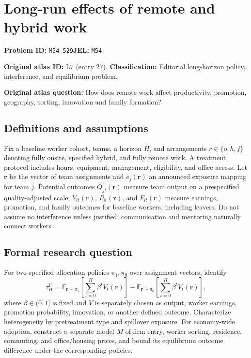 \documentclass[11pt,a4paper]{article}
\begin{document}
\section*{Long-run effects of remote and hybrid work}
\textbf{Problem ID:} \texttt{M54-529}\quad \textbf{JEL:} \texttt{M54}\par
\label{problem:OP-0027}
\label{atlas:prob:L7}
\noindent\textbf{Original atlas ID:} L7 (entry 27). \textbf{Classification:} Editorial long-horizon policy, interference, and equilibrium problem.

\noindent\textbf{Original atlas question:} How does remote work affect productivity, promotion, geography, sorting, innovation and family formation?

\subsection*{Definitions and assumptions}
Fix a baseline worker cohort, teams, a horizon $H$, and arrangements $r\in\{o,h,f\}$ denoting fully onsite, specified hybrid, and fully remote work. A treatment protocol includes hours, equipment, management, eligibility, and office access. Let $\mathbf r$ be the vector of team assignments and $e_j(\mathbf r)$ an announced exposure mapping for team $j$. Potential outcomes $Q_{jt}(\mathbf r)$ measure team output on a prespecified quality-adjusted scale; $Y_{it}(\mathbf r)$, $P_{it}(\mathbf r)$, and $F_{it}(\mathbf r)$ measure earnings, promotion, and family outcomes for baseline workers, including leavers. Do not assume no interference unless justified; communication and mentoring naturally connect workers.
\subsection*{Formal research question}
For two specified allocation policies $\pi_1,\pi_0$ over assignment vectors, identify
\[
 \tau_H^V=\mathbb E_{\mathbf r\sim\pi_1}
       \left[\sum_{t=0}^{H}\beta^t V_t(\mathbf r)\right]
       -\mathbb E_{\mathbf r\sim\pi_0}
       \left[\sum_{t=0}^{H}\beta^t V_t(\mathbf r)\right],
\]
where $\beta\in(0,1]$ is fixed and $V$ is separately chosen as output, worker earnings, promotion probability, innovation, or another defined outcome. Characterize heterogeneity by pretreatment type and spillover exposure. For economy-wide adoption, construct a separate model $M$ of firm entry, worker sorting, residence, commuting, and office/housing prices, and bound its equilibrium outcome difference under the corresponding policies.
\end{document}
